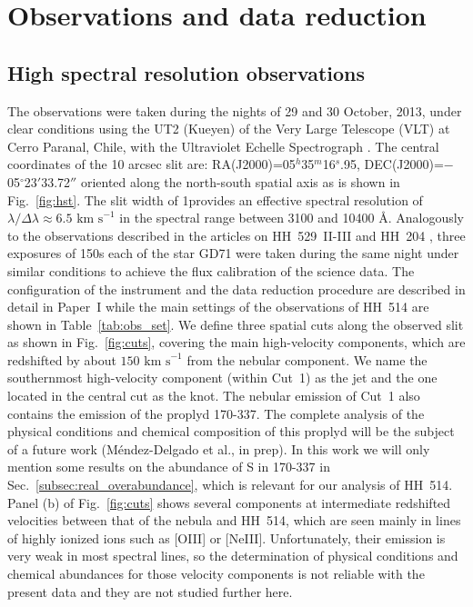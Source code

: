 \documentclass[fleqn,usenatbib]{mnras}
\begin{document}
\section{Observations and data reduction}
\label{sec:data}

\subsection{High spectral resolution observations}
\label{sec:data_uves}

The observations were taken during the nights of 29 and 30 October, 2013, under clear conditions using the UT2 (Kueyen) of the Very Large Telescope (VLT) at Cerro Paranal, Chile, with the Ultraviolet Echelle Spectrograph \citep[UVES;][]{Dodorico00}. The central coordinates of the 10 arcsec slit are: RA(J2000)=05$^h$35$^m$16$^s$.95, DEC(J2000)=$-$05$^{\circ}$23$'$33.72$''$ oriented along the north-south spatial axis as is shown in Fig.~\ref{fig:hst}. The slit width of 1\arcsec provides an effective spectral resolution of $\lambda/\Delta \lambda \approx 6.5 \text{ km s}^{-1}$ in the spectral range between 3100 and 10400 \AA. Analogously to the observations described in the articles on HH~529~II-III and HH~204 \citep[][hereinafter Paper~I and Paper~II, respectively]{mendez2021,mendez2021-2}, three exposures of 150s each of the star GD71 \citep{Moehler14a, Moehler14b} were taken during the same night under similar conditions to achieve the flux calibration of the science data. The configuration of the instrument and the data reduction procedure are described in detail in Paper~I while the main settings of the observations of HH~514 are shown in Table~\ref{tab:obs_set}. We define three spatial cuts along the observed slit as shown in Fig.~\ref{fig:cuts}, covering the main high-velocity components,
which are redshifted by about $150\text{ km s}^{-1}$ from the nebular component.
We name the southernmost high-velocity component (within Cut~1) as the jet and the one located in the central cut as the knot. The nebular emission of Cut~1 also contains the emission of the proplyd 170-337. The complete analysis of the physical conditions and chemical composition of this proplyd will be the subject of a future work (M\'endez-Delgado et al., in prep). In this work we will only mention some results on the abundance of S in 170-337 in Sec.~\ref{subsec:real_overabundance}, which is relevant for our analysis of HH~514. Panel (b) of Fig.~\ref{fig:cuts} shows several components at intermediate redshifted velocities between that of the nebula and HH~514, which are seen mainly in lines of highly ionized ions such as [O\thinspace III] or [Ne\thinspace III]. Unfortunately, their emission is very weak in most spectral lines, so the determination of physical conditions and chemical abundances for those velocity components is  not reliable with the present data and they are not studied further here.
\end{document}
